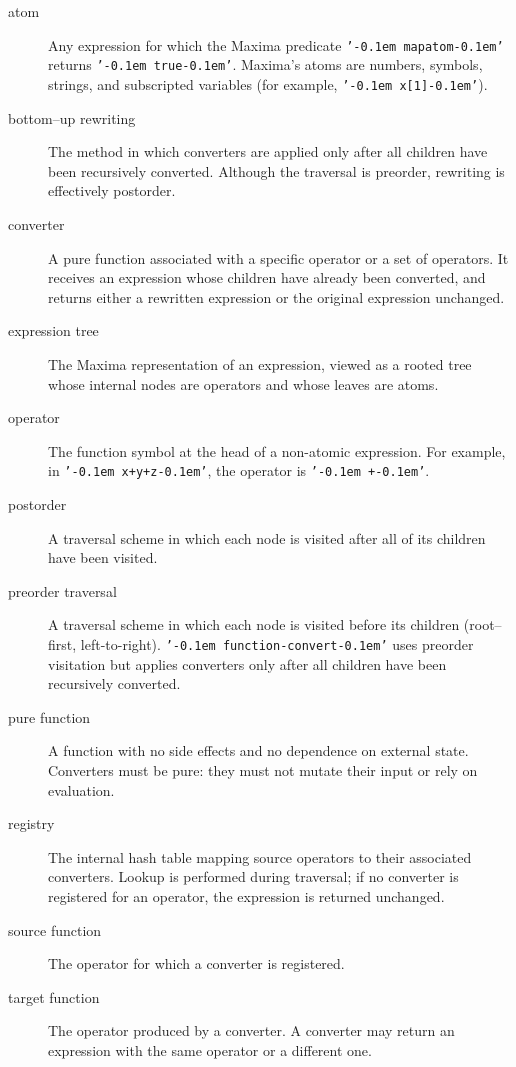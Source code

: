 \documentclass[12pt,fleqn]{extarticle}
\newcommand{\ttq}[1]{\texttt{'\kern-0.1em #1\kern-0.1em'}}
\begin{document}
\begin{description}

\item[atom]  
Any expression for which the Maxima predicate \ttq{mapatom} returns \ttq{true}.  Maxima's
atoms are numbers, symbols, strings, and subscripted variables (for example, \ttq{x[1]}).

\item[bottom--up rewriting]  
The method in which converters are applied only after all children have been recursively converted.  
Although the traversal is preorder, rewriting is effectively postorder.



\item[converter]  
A pure function associated with a specific operator or a set of operators.
It receives an expression whose children have already been converted, and returns either a rewritten expression or the original expression unchanged.

\item[expression tree]  
The  Maxima representation of an expression, viewed as a rooted tree whose internal nodes are operators and whose leaves are atoms.

\item[operator]  
The function symbol at the head of a non-atomic expression.  
For example, in \ttq{x+y+z}, the operator is \ttq{+}.

\item[postorder]  
A traversal scheme in which each node is visited after all of its children have been visited.

\item[preorder traversal]  
A traversal scheme in which each node is visited before its children (root--first, left-to-right).  
\ttq{function-convert} uses preorder visitation but applies converters only after all children have been recursively converted.

\item[pure function]  
A function with no side effects and no dependence on external state.  
Converters must be pure: they must not mutate their input or rely on evaluation.

\item[registry]  
The internal hash table mapping source operators to their associated converters.  
Lookup is performed during traversal; if no converter is registered for an operator, the expression is returned unchanged.

\item[source function]  
The operator for which a converter is registered.  


\item[target function]  
The operator produced by a converter.  
A converter may return an expression with the same operator or a different one.

\end{description}
\end{document}
